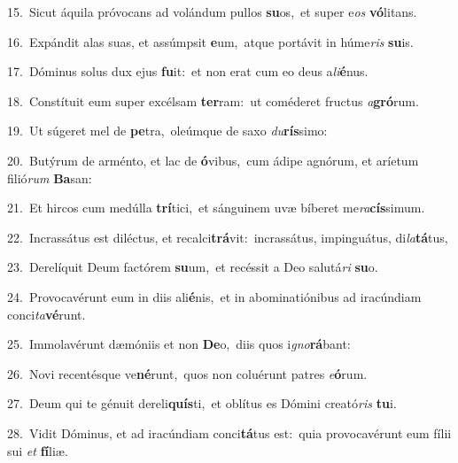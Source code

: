 {\numbfont\textcolor{\numbcolor}{15.}}~Sicut áquila próvocans ad volándum pullos \textbf{su}\-os,~\star et super e\textit{os} \textbf{vó}\-litans.\par
{\numbfont\textcolor{\numbcolor}{16.}}~Expándit alas suas, et assúmpsit \textbf{e}\-um,~\star atque portávit in húme\textit{ris} \textbf{su}\-is.\par
{\numbfont\textcolor{\numbcolor}{17.}}~Dóminus solus dux ejus \textbf{fu}\-it:~\star et non erat cum eo deus a\-\textit{li}\-\textbf{é}nus.\par
{\numbfont\textcolor{\numbcolor}{18.}}~Constítuit eum super excélsam \textbf{ter}\-ram:~\star ut coméderet fructus \textit{a}\-\textbf{gró}rum.\par
{\numbfont\textcolor{\numbcolor}{19.}}~Ut súgeret mel de \textbf{pe}\-tra,~\star oleúmque de saxo \textit{du}\-\textbf{rís}simo:\par
{\numbfont\textcolor{\numbcolor}{20.}}~Butýrum de arménto, et lac de \textbf{ó}\-vibus,~\star cum ádipe agnórum, et aríetum filió\textit{rum} \textbf{Ba}\-san:\par
{\numbfont\textcolor{\numbcolor}{21.}}~Et hircos cum medúlla \textbf{trí}\-tici,~\star et sánguinem uvæ bíberet me\-\textit{ra}\-\textbf{cís}simum.\par
{\numbfont\textcolor{\numbcolor}{22.}}~Incrassátus est diléctus, et recalci\-\textbf{trá}\-vit:~\star incrassátus, impinguátus, di\-\textit{la}\-\textbf{tá}tus,\par
{\numbfont\textcolor{\numbcolor}{23.}}~Derelíquit Deum factórem \textbf{su}\-um,~\star et recéssit a Deo salutá\textit{ri} \textbf{su}\-o.\par
{\numbfont\textcolor{\numbcolor}{24.}}~Provocavérunt eum in diis ali\-\textbf{é}\-nis,~\star et in abominatiónibus ad iracúndiam conci\-\textit{ta}\-\textbf{vé}runt.\par
{\numbfont\textcolor{\numbcolor}{25.}}~Immolavérunt dæmóniis et non \textbf{De}\-o,~\star diis quos i\-\textit{gno}\-\textbf{rá}bant:\par
{\numbfont\textcolor{\numbcolor}{26.}}~Novi recentésque ve\-\textbf{né}\-runt,~\star quos non coluérunt patres \textit{e}\-\textbf{ó}rum.\par
{\numbfont\textcolor{\numbcolor}{27.}}~Deum qui te génuit dereli\-\textbf{quís}\-ti,~\star et oblítus es Dómini creató\textit{ris} \textbf{tu}\-i.\par
{\numbfont\textcolor{\numbcolor}{28.}}~Vidit Dóminus, et ad iracúndiam conci\-\textbf{tá}\-tus est:~\star quia provocavérunt eum fílii sui \textit{et} \textbf{fí}\-liæ.\par
